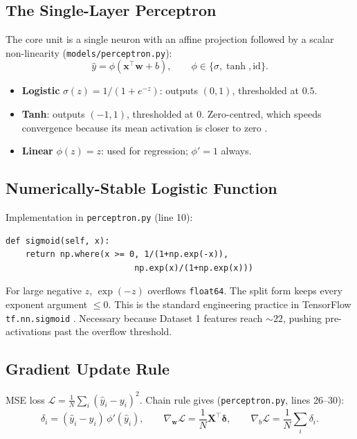 \documentclass[11pt,a4paper]{article}
\newcommand{\code}[1]{\texttt{\small #1}}
\begin{document}
\subsection{The Single-Layer Perceptron}

The core unit is a single neuron with an affine projection followed by a scalar non-linearity
(\code{models/perceptron.py}):
\begin{equation}
\hat{y} = \phi(\mathbf{x}^{\top}\mathbf{w} + b), \qquad
\phi \in \{\sigma, \tanh, \mathrm{id}\}.
\label{eq:forward}
\end{equation}

\begin{itemize}
\item \textbf{Logistic} $\sigma(z) = 1/(1+e^{-z})$: outputs $(0,1)$, thresholded at $0.5$.
\item \textbf{Tanh}: outputs $(-1,1)$, thresholded at $0$. Zero-centred, which speeds
convergence because its mean activation is closer to zero \cite{lecun1998efficient}.
\item \textbf{Linear} $\phi(z)=z$: used for regression; $\phi'=1$ always.
\end{itemize}

\subsection{Numerically-Stable Logistic Function}\label{sec:logistic-stability}

Implementation in \code{perceptron.py} (line 10):
\begin{lstlisting}
def sigmoid(self, x):
    return np.where(x >= 0, 1/(1+np.exp(-x)),
                          np.exp(x)/(1+np.exp(x)))
\end{lstlisting}

For large negative $z$, $\exp(-z)$ overflows \code{float64}. The split form keeps every
exponent argument $\le 0$. This is the standard engineering practice in TensorFlow
\code{tf.nn.sigmoid} \cite{numpy2024}. Necessary because Dataset 1 features reach $\sim 22$,
pushing pre-activations past the overflow threshold.

\subsection{Gradient Update Rule}\label{sec:gradient}

MSE loss $\mathcal{L} = \frac{1}{N}\sum_i (\hat y_i - y_i)^2$. Chain rule gives
(\code{perceptron.py}, lines 26--30):
\begin{equation}
\delta_i = (\hat y_i - y_i)\,\phi'(\hat y_i), \qquad
\nabla_{\mathbf{w}} \mathcal{L} = \frac{1}{N}\mathbf{X}^{\top}\boldsymbol{\delta}, \qquad
\nabla_b \mathcal{L} = \frac{1}{N}\sum_i \delta_i .
\end{equation}
\end{document}
